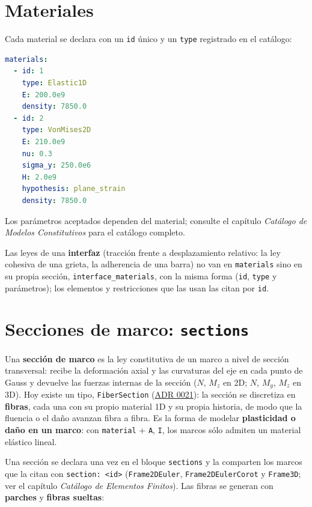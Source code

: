 \documentclass[11pt,oneside]{report}
\begin{document}
\section{Materiales}

Cada material se declara con un \texttt{id} único y un \texttt{type} registrado en el catálogo:

\begin{lstlisting}[language=yaml]
materials:
  - id: 1
    type: Elastic1D
    E: 200.0e9
    density: 7850.0
  - id: 2
    type: VonMises2D
    E: 210.0e9
    nu: 0.3
    sigma_y: 250.0e6
    H: 2.0e9
    hypothesis: plane_strain
    density: 7850.0

\end{lstlisting}

Los parámetros aceptados dependen del material; consulte el capítulo \textit{Catálogo de Modelos Constitutivos} para el catálogo completo.

Las leyes de una \textbf{interfaz} (tracción frente a desplazamiento relativo: la ley cohesiva de una grieta, la adherencia de una barra) no van en \texttt{materials} sino en su propia sección, \texttt{interface\_\allowbreak{}materials}, con la misma forma (\texttt{id}, \texttt{type} y parámetros); los elementos y restricciones que las usan las citan por \texttt{id}.

\section{Secciones de marco: \texttt{sections}}

Una \textbf{sección de marco} es la ley constitutiva de un marco a nivel de sección transversal: recibe la deformación axial y las curvaturas del eje en cada punto de Gauss y devuelve las fuerzas internas de la sección ($N$, $M_z$ en 2D; $N$, $M_y$, $M_z$ en 3D). Hoy existe un tipo, \texttt{FiberSection} (\href{https://github.com/jretamav/solidum-fem/blob/main/docs/adr/0021-secciones-de-marco-y-seccion-por-fibras.md}{ADR 0021}): la sección se discretiza en \textbf{fibras}, cada una con su propio material 1D y su propia historia, de modo que la fluencia o el daño avanzan fibra a fibra. Es la forma de modelar \textbf{plasticidad o daño en un marco}: con \texttt{material} + \texttt{A}, \texttt{I}, los marcos sólo admiten un material elástico lineal.

Una sección se declara una vez en el bloque \texttt{sections} y la comparten los marcos que la citan con \texttt{section: \textless{}id\textgreater{}} (\texttt{Frame2DEuler}, \texttt{Frame2DEulerCorot} y \texttt{Frame3D}; ver el capítulo \textit{Catálogo de Elementos Finitos}). Las fibras se generan con \textbf{parches} y \textbf{fibras sueltas}:
\end{document}
